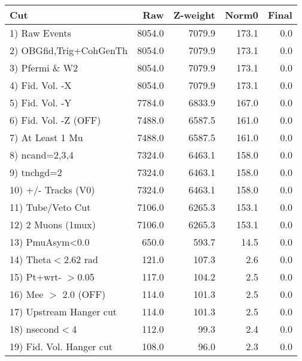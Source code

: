  \begin{table}[h!]\centering
 \begin{tabular}{||l||r|r|r|r||}
 \hline
 \hline
 Cut & Raw & Z-weight & Norm0 & Final \\
 \hline
  1) Raw Events           &      8054.0 &      7079.9 &       173.1 &         0.0 \\
  2) OBGfid,Trig+CohGenTh &      8054.0 &      7079.9 &       173.1 &         0.0 \\
  3) Pfermi \& W2         &      8054.0 &      7079.9 &       173.1 &         0.0 \\
  4) Fid. Vol. -X         &      8054.0 &      7079.9 &       173.1 &         0.0 \\
  5) Fid. Vol. -Y         &      7784.0 &      6833.9 &       167.0 &         0.0 \\
  6) Fid. Vol. -Z (OFF)   &      7488.0 &      6587.5 &       161.0 &         0.0 \\
  7) At Least 1 Mu        &      7488.0 &      6587.5 &       161.0 &         0.0 \\
  8) ncand=2,3,4          &      7324.0 &      6463.1 &       158.0 &         0.0 \\
  9) tnchgd=2             &      7324.0 &      6463.1 &       158.0 &         0.0 \\
 10) +/- Tracks (V0)      &      7324.0 &      6463.1 &       158.0 &         0.0 \\
 11) Tube/Veto Cut        &      7106.0 &      6265.3 &       153.1 &         0.0 \\
 12) 2 Muons (1mux)       &      7106.0 &      6265.3 &       153.1 &         0.0 \\
 13) PmuAsym<0.0          &       650.0 &       593.7 &        14.5 &         0.0 \\
 14) Theta$<$2.62 rad     &       121.0 &       107.3 &         2.6 &         0.0 \\
 15) Pt+wrt- $>$0.05      &       117.0 &       104.2 &         2.5 &         0.0 \\
 16) Mee $>$ 2.0  (OFF)   &       114.0 &       101.3 &         2.5 &         0.0 \\
 17) Upstream Hanger cut  &       114.0 &       101.3 &         2.5 &         0.0 \\
 18) nsecond$<$4          &       112.0 &        99.3 &         2.4 &         0.0 \\
 19) Fid. Vol. Hanger cut &       108.0 &        96.0 &         2.3 &         0.0 \\

\end{tabular}
\end{table}
